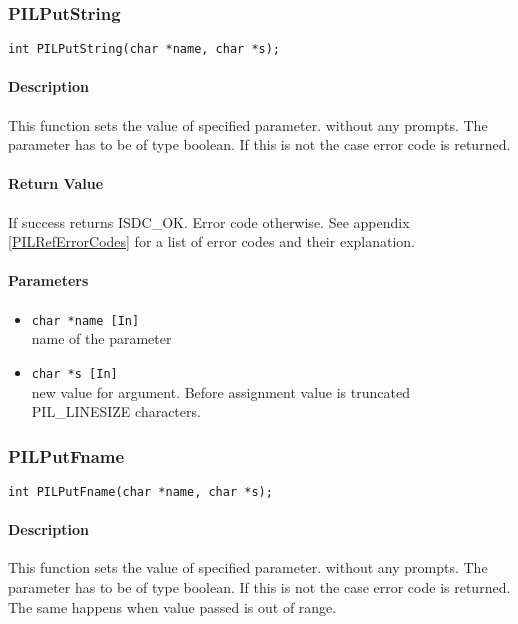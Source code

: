 
\subsubsection{PILPutString}

\begin{verbatim}
int PILPutString(char *name, char *s); 
\end{verbatim}

\paragraph{Description\\}
This function sets the value of specified parameter. without any prompts.
The parameter has to be of type
boolean. If this is not the case error code is returned. 

\paragraph{Return Value\\}
If success returns ISDC\_OK. Error code otherwise. See appendix \ref{PILRefErrorCodes}
for a list of error codes and their explanation.

\paragraph{Parameters}
\begin{itemize}
\item
{\tt char *name [In] } \\
name of the parameter 
\item
{\tt char *s [In] } \\
new value for argument. Before assignment value is truncated PIL\_LINESIZE
characters. 
\end{itemize}



\subsubsection{PILPutFname}

\begin{verbatim}
int PILPutFname(char *name, char *s); 
\end{verbatim}

\paragraph{Description\\}
This function sets the value of specified parameter. without any prompts.
The parameter has to be of type
boolean. If this is not the case error code is returned. 
The same happens when value passed is out of range.

